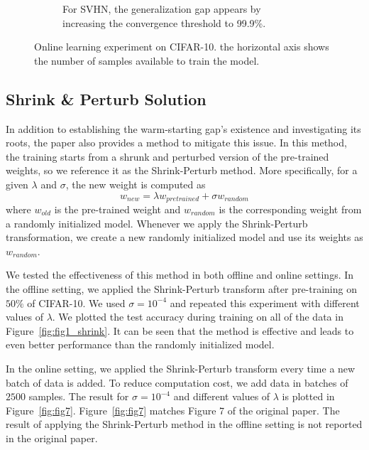 \begin{figure}
\begin{subfigure}[t]{0.225\textwidth}
         \caption{For SVHN, the generalization gap appears by increasing the convergence threshold to 99.9\%.}
         \label{fig:fig2-svhn-99.9}
     \end{subfigure}
%

    \caption{Online learning experiment on CIFAR-10. the horizontal axis shows the number of samples available to train the model.}
    \label{fig2-CIFAR-10-svhn-99}

\end{figure}



\subsection{Shrink \& Perturb Solution}
In addition to establishing the warm-starting gap's existence and investigating its roots, the paper also provides a method to mitigate this issue. In this method, the training starts from a shrunk and perturbed version of the pre-trained weights, so we reference it as the Shrink-Perturb method. More specifically, for a given $\lambda$ and $\sigma$, the new weight is computed as
\begin{equation}
w_{new} =  \lambda w_{pretrained} + \sigma w_{random}
\end{equation}
where $w_{old}$ is the pre-trained weight and $w_{random}$ is the corresponding weight from a randomly initialized model. Whenever we apply the Shrink-Perturb transformation, we create a new randomly initialized model and use its weights as $w_{random}$. 

We tested the effectiveness of this method in both offline and online settings. In the offline setting, we applied the Shrink-Perturb transform after pre-training on $50\%$ of CIFAR-10. We used $\sigma = 10^{-4}$ and repeated this experiment with different values of $\lambda$. We plotted the test accuracy during training on all of the data in Figure~\ref{fig:fig1_shrink}. It can be seen that the method is effective and leads to even better performance than the randomly initialized model. 

In the online setting, we applied the Shrink-Perturb transform every time a new batch of data is added. To reduce computation cost, we add data in batches of $2500$ samples. The result for $\sigma = 10^{-4}$ and different values of $\lambda$ is plotted in Figure~\ref{fig:fig7}. Figure~\ref{fig:fig7} matches Figure 7 of the original paper. The result of applying the Shrink-Perturb method in the offline setting is not reported in the original paper.


